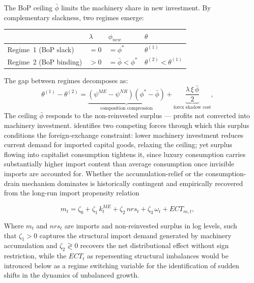 The BoP ceiling $\bar{\phi}$ limits the machinery share in new
investment. By complementary slackness, two regimes emerge:
%
\begin{center}
	\begin{tabular}{llll}
		\toprule
		& $\lambda$ & $\phi_{new}$ & $\theta$ \\
		\midrule
		Regime~1 (BoP slack) & $= 0$ & $= \phi^*$ & $\theta^{(1)}$ \\
		Regime~2 (BoP binding) & $> 0$ & $= \bar{\phi} < \phi^*$
		& $\theta^{(2)} < \theta^{(1)}$ \\
		\bottomrule
	\end{tabular}
\end{center}
%
The gap between regimes decomposes as:
%
\begin{equation}
	\theta^{(1)}-\theta^{(2)}
	=
	\underbrace{
		(\psi^{ME}-\psi^{NR})(\phi^*-\bar{\phi})
	}_{\text{composition compression}}
	+
	\underbrace{
		\frac{\lambda\,\xi\,\bar{\phi}}{2}
	}_{\text{forex shadow cost}},
	\label{eq:cl:theta_gap}
\end{equation}
%
The ceiling $\bar{\phi}$ responds to the non-reinvested surplus --- 
profits not converted into machinery investment. \citet{Kaldor1959} 
identifies two competing forces through which this surplus conditions 
the foreign-exchange constraint: lower machinery investment reduces 
current demand for imported capital goods, relaxing the ceiling; yet 
surplus flowing into capitalist consumption tightens it, since luxury 
consumption carries substantially higher import content than average 
consumption once invisible imports are accounted for. Whether the 
accumulation-relief or the consumption-drain mechanism dominates is 
historically contingent and empirically recovered from the long-run 
import propensity relation

\begin{equation}
	m_t
	=
	\zeta_0
	+
	\zeta_1\, k_t^{ME}
	+
	\zeta_2\, nrs_t
	+
	\zeta_3\, \omega_t
	+
	ECT_{m,t},
	\label{eq:cl:imports_coint}
\end{equation}

Where \(m_t\) and  \(nrs_t\) are imports and non-reinvested surplus in log levels, 
such that  $\zeta_1 > 0$ captures the structural import demand generated 
by machinery accumulation and $\zeta_2 \gtrless 0$ recovers the net 
distributional effect without sign restriction, while the $ECT_t$ as repersenting 
structural imbalances would be introuced below as a regime switching variable for 
the identification of sudden shifts in the dynamics of unbalanced growth. 

